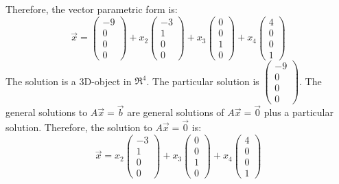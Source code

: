 \noindent
\newline
Therefore, the vector parametric form is:
\begin{equation}
    \Vec{x} = \begin{pmatrix}
        -9 \\
        0 \\
        0 \\
        0
    \end{pmatrix} + x_2 \begin{pmatrix}
        -3 \\
        1 \\
        0 \\
        0
    \end{pmatrix} + x_3 \begin{pmatrix}
        0 \\
        0 \\
        1 \\
        0
    \end{pmatrix} + x_4 \begin{pmatrix}
        4 \\
        0 \\
        0 \\
        1
    \end{pmatrix}
\end{equation}
The solution is a 3D-object in \(\Re^4\). The particular solution is \(\begin{pmatrix}
        -9 \\
        0 \\
        0 \\
        0
\end{pmatrix}\). The general solutions to \(A\Vec{x}=\Vec{b}\) are general solutions of \(A\Vec{x}=\Vec{0}\) plus a particular solution. Therefore, the solution to \(A\Vec{x} = \Vec{0}\) is:
\begin{equation}
    \Vec{x} = x_2 \begin{pmatrix}
        -3 \\
        1 \\
        0 \\
        0
    \end{pmatrix} + x_3 \begin{pmatrix}
        0 \\
        0 \\
        1 \\
        0
    \end{pmatrix} + x_4 \begin{pmatrix}
        4 \\
        0 \\
        0 \\
        1
    \end{pmatrix}
\end{equation}


